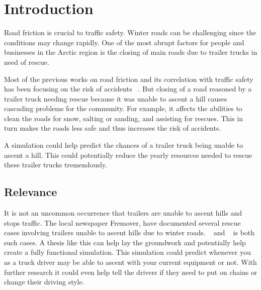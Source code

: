 \documentclass[noprint]{uit-thesis}
\begin{document}
\tableofcontents
\listoffigures
\listoftables

\mainmatter




\chapter{Introduction}
Road friction is crucial to traffic safety. Winter roads can be challenging since the conditions may change rapidly. One of the most abrupt factors for people and businesses in the Arctic region is the closing of main roads due to trailer trucks in need of rescue. 
\par 
Most of the previous works on road friction and its correlation with traffic safety has been focusing on the risk of accidents ~\citep{Friction}. But closing of a road reasoned by a trailer truck needing rescue because it was unable to ascent a hill causes cascading problems for the community. For example, it affects the abilities to clean the roads for snow, salting or sanding, and assisting for rescues. This in turn makes the roads less safe and thus increases the risk of accidents.
\par
A simulation could help predict the chances of a trailer truck being unable to ascent a hill. This could potentially reduce the yearly resources needed to rescue these trailer trucks tremendously. 

\section{Relevance}
It is not an uncommon occurrence that trailers are unable to ascent hills and stops traffic. The local newspaper Fremover, have documented several rescue cases involving trailers unable to ascent hills due to winter roads. ~\citep{Treldal} and ~\citep{Taraldsvikbakken} is both such cases. A thesis like this can help lay the groundwork and potentially help create a fully functional simulation. This simulation could predict whenever you as a truck driver may be able to ascent with your current equipment or not. With further research it could even help tell the drivers if they need to put on chains or change their driving style. 
\end{document}
